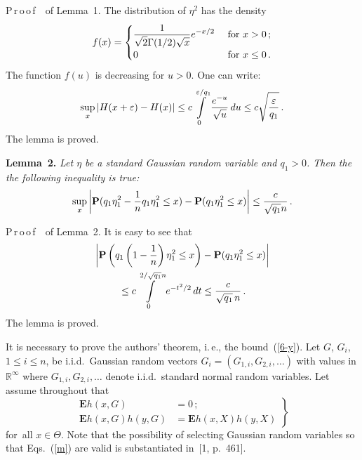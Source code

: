 \begin{multicols}{2}
\smallskip

\noindent
P\,r\,o\,o\,f\ \ of Lemma~1.
    The distribution of
    $\eta^2$ has the density
    $$ 
    f(x)=
    \begin{cases}
    \displaystyle\frac{\displaystyle 1\mathstrut}{\displaystyle \sqrt{2}\Gamma(1/2)\sqrt{x}\mathstrut}e^{-x/2} &\ \mbox{for} \ x>0\,;\\
    0 &\ \mbox{for} \ x\leq 0\,.
    \end{cases}
    $$
    The function $f(u)$ is decreasing for $u >0$.
    One can write:
    $$\sup\limits_{x}|H(x+\varepsilon)-H(x)|\leq
    c\int\limits^{\varepsilon/q_1}_{0}\displaystyle\frac{\displaystyle e^{-u}\mathstrut}{\displaystyle \sqrt{u}\mathstrut}\,du\leq c\sqrt{
    \displaystyle\frac{\displaystyle \varepsilon\mathstrut}{\displaystyle q_1\mathstrut}}\,.
    $$
    The lemma is proved.

\smallskip

\noindent
\textbf{Lemma~2.} \textit{Let $\eta$ be a standard Gaussian random variable and $q_1 >0$.
    Then the the following inequality is true:}
      \begin{equation*} %
   \sup\limits_{x}\left\vert\mathbf{P}(q_1\eta_1^{2}- \fr{1}{n}q_1\eta_1^{2}\leq x)-
   \mathbf{P}(q_1\eta_1^{2}\leq x)\right\vert %
\leq
\fr{c}{\sqrt{q_1}n}\,.
    \end{equation*} %
   
\smallskip

\noindent
P\,r\,o\,o\,f\ \ of Lemma~2.
    It is easy to see that
\begin{multline*}
\left\vert\mathbf{P}\left(q_1\left(1-\displaystyle\frac{\displaystyle 1\mathstrut}{\displaystyle n\mathstrut}\right)\eta_1^{2}\leq x\right)-
\mathbf{P}(q_1\eta_1^{2}\leq
    x)\right\vert\\
    {}\leq c\int\limits_{0}^{2/\sqrt{q_1}n}e^{-t^{2}/2}\,dt\leq \displaystyle\frac{\displaystyle c\mathstrut}{\displaystyle \sqrt{q_1}\,n\mathstrut}\,.
    \end{multline*}
    The lemma is proved.

\columnbreak

It is necessary to prove the authors' theorem, i.\,e., the bound~(\ref{6-y}).
    Let $G$, $G_i$, $1 \leq i \leq n$, be i.i.d.\ Gaussian random vectors
    $G_i =(G_{1,i},G_{2,i},\ldots)$ with
    values in $\mathbb{R}^{\infty}$ where $G_{1,i},G_{2,i},\ldots$ denote i.i.d.\ standard normal
    random variables. Let assume throughout that
\begin{equation}
\left.
\begin{array}{rl}
     \mathbf{E}h(x,G)&=0\,;\\[9pt]
     \mathbf{E}h(x,G)h(y,G)&=\mathbf{E}h(x,X)h(y,X)
    \end{array}
 \right\}
 \label{m}
    \end{equation}
for~all $x\in\Theta$.
    Note that the possibility of selecting Gaussian random
    variables so that Eqs.~(\ref{m}) are valid is substantiated
    in~[1, p.~461].


\end{multicols}

